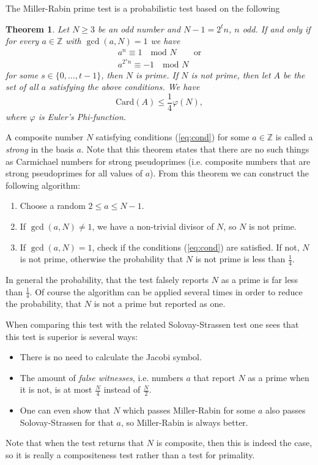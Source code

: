 \documentclass[12pt]{article}
\newtheorem{theorem}{Theorem}
\begin{document}
The Miller-Rabin prime test is a probabilistic test based on the following
\begin{theorem}
Let $N\geq 3$ be an odd number and $N-1=2^tn$, $n$ odd. If and only if for every $a\in\mathbb{Z}$ with $\gcd(a,N)=1$ we have
\begin{subequations}\label{eq:cond}
\begin{gather}
a^n\equiv 1\quad\text{mod }N\qquad\text{or}\\
a^{2^sn}\equiv-1\quad\text{mod }N
\end{gather}
\end{subequations}
for some $s\in\{0,\dots,t-1\}$, then $N$ is prime. If $N$ is not prime, then let $A$ be the set of all $a$ satisfying the above conditions. We have
$$\text{Card}(A)\leq\frac{1}{4}\varphi(N),$$
where $\varphi$ is Euler's Phi-function.
\end{theorem}
A composite number $N$ satisfying conditions (\ref{eq:cond}) for some $a\in\mathbb{Z}$ is called a \textit{strong } in the basis $a$. Note that this theorem states that there are no such things as Carmichael numbers for strong pseudoprimes (i.e. composite numbers that are strong pseudoprimes for all values of $a$).
From this theorem we can construct the following algorithm:
\begin{enumerate}
\item Choose a random $2\leq a\leq N-1$.
\item If $\gcd(a,N)\neq 1$, we have a non-trivial divisor of $N$, so $N$ is not prime.
\item If $\gcd(a,N)=1$, check if the conditions (\ref{eq:cond}) are satisfied. If not, $N$ is not prime, otherwise the probability that $N$ is not prime is less than $\frac{1}{4}$.
\end{enumerate}
In general the probability, that the test falsely reports $N$ as a prime is far less than $\frac{1}{4}$. Of course the algorithm can be applied several times in order to reduce the probability, that $N$ is not a prime but reported as one.

When comparing this test with the related Solovay-Strassen test one sees that this test is superior is several ways:
\begin{itemize}
\item There is no need to calculate the Jacobi symbol.
\item The amount of \textit{false witnesses}, i.e. numbers $a$ that report $N$ as a prime when it is not, is at most $\frac{N}{4}$ instead of $\frac{N}{2}$.
\item One can even show that $N$ which passes Miller-Rabin for some $a$ also passes Solovay-Strassen for that $a$, so Miller-Rabin is always better.
\end{itemize}
Note that when the test returns that $N$ is composite, then this is indeed the case, so it is really a compositeness test rather than a test for primality.
\end{document}
